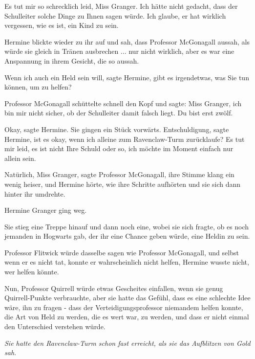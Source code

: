 \glqq{}Es tut mir so schrecklich leid, Miss Granger. Ich hätte nicht gedacht,
dass der Schulleiter solche Dinge zu Ihnen sagen würde. Ich glaube, er hat
wirklich vergessen, wie es ist, ein Kind zu sein.\grqq{}

Hermine blickte wieder zu ihr auf und sah, dass Professor McGonagall aussah, als
würde sie gleich in Tränen ausbrechen ... nur nicht wirklich, aber es war eine
Anspannung in ihrem Gesicht, die so aussah.

\glqq{}Wenn ich auch ein Held sein will\grqq{}, sagte Hermine, \glqq{}gibt es
irgendetwas, was Sie tun können, um zu helfen?\grqq{}

Professor McGonagall schüttelte schnell den Kopf und sagte: \glqq{}Miss Granger,
ich bin mir nicht sicher, ob der Schulleiter damit falsch liegt. Du bist erst
zwölf.\grqq{}

\glqq{}Okay\grqq{}, sagte Hermine. Sie gingen ein Stück vorwärts. \glqq{}
Entschuldigung\grqq{}, sagte Hermine, \glqq{}ist es okay, wenn ich alleine zum
Ravenclaw-Turm zurücklaufe? Es tut mir leid, es ist nicht Ihre Schuld oder so,
ich möchte im Moment einfach nur allein sein.\grqq{}

\glqq{}Natürlich, Miss Granger\grqq{}, sagte Professor McGonagall, ihre Stimme
klang ein wenig heiser, und Hermine hörte, wie ihre Schritte aufhörten und sie
sich dann hinter ihr umdrehte.

Hermine Granger ging weg.

Sie stieg eine Treppe hinauf und dann noch eine, wobei sie sich fragte, ob es
noch jemanden in Hogwarts gab, der ihr eine Chance geben würde, eine Heldin zu
sein.

Professor Flitwick würde dasselbe sagen wie Professor McGonagall, und selbst
wenn er es nicht tat, konnte er wahrscheinlich nicht helfen, Hermine wusste
nicht, wer helfen könnte.

Nun, Professor Quirrell würde etwas Gescheites einfallen, wenn sie genug
Quirrell-Punkte verbrauchte, aber sie hatte das Gefühl, dass es eine schlechte
Idee wäre, ihn zu fragen - dass der Verteidigungsprofessor niemandem helfen
konnte, die Art von Held zu werden, die es wert war, zu werden, und dass er
nicht einmal den Unterschied verstehen würde.

\emph{Sie hatte den Ravenclaw-Turm
schon fast erreicht, als sie das Aufblitzen von Gold sah.}

